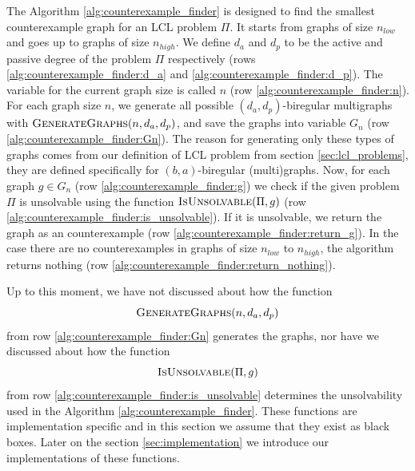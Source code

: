 The Algorithm \ref{alg:counterexample_finder} is designed to find the smallest counterexample graph for an LCL problem $\Pi$.
It starts from graphs of size $n_{low}$ and goes up to graphs of size $n_{high}$.
We define $d_a$ and $d_p$ to be the active and passive degree of the problem $\Pi$ respectively (rows \ref{alg:counterexample_finder:d_a} and \ref{alg:counterexample_finder:d_p}).
The variable for the current graph size is called $n$ (row \ref{alg:counterexample_finder:n}).
For each graph size $n$, we generate all possible $(d_a, d_p)$-biregular multigraphs with $\textsc{GenerateGraphs}(n, d_a, d_p)$, and save the graphs into variable $G_n$ (row \ref{alg:counterexample_finder:Gn}).
The reason for generating only these types of graphs comes from our definition of LCL problem from section \ref{sec:lcl_problems}, they are defined specifically for $(b,a)$-biregular (multi)graphs.
Now, for each graph $g \in G_n$ (row \ref{alg:counterexample_finder:g}) we check if the given problem $\Pi$ is unsolvable using the function $\textsc{IsUnsolvable}(\Pi, g)$ (row \ref{alg:counterexample_finder:is_unsolvable}).
If it is unsolvable, we return the graph as an counterexample (row \ref{alg:counterexample_finder:return_g}).
In the case there are no counterexamples in graphs of size $n_{low}$ to $n_{high}$, the algorithm returns nothing (row \ref{alg:counterexample_finder:return_nothing}).

Up to this moment, we have not discussed about how the function $$\textsc{GenerateGraphs}(n, d_a, d_p)$$ from row \ref{alg:counterexample_finder:Gn} generates the graphs, nor have we discussed about how the function $$\textsc{IsUnsolvable}(\Pi, g)$$ from row \ref{alg:counterexample_finder:is_unsolvable} determines the unsolvability used in the Algorithm \ref{alg:counterexample_finder}.
These functions are implementation specific and in this section we assume that they exist as black boxes.
Later on the section \ref{sec:implementation} we introduce our implementations of these functions.



